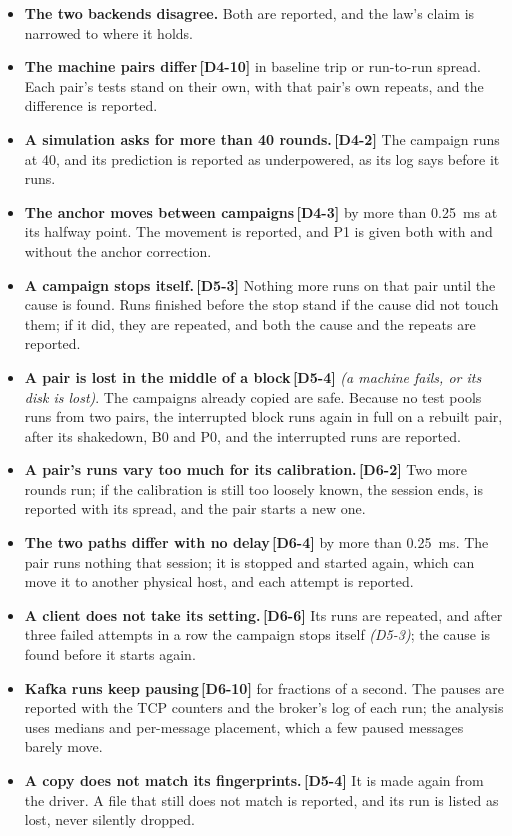 \documentclass[11pt]{article}
\newcommand{\gl}[1]{{\color{soft}\itshape\small (#1)}}
\newcommand{\chg}[1]{\,{\color{chgcol}\bfseries\footnotesize[#1]}}
\newcommand{\chgold}[1]{\,{\color{oldcol}\bfseries\footnotesize[#1]}}
\begin{document}
\begin{itemize}
  \item \textbf{The two backends disagree.} Both are reported, and the law's claim is narrowed to where it holds.
  \item \textbf{The machine pairs differ}\chgold{D4-10} in baseline trip or run-to-run spread. Each pair's tests stand on their own, with that pair's own repeats, and the difference is reported.
  \item \textbf{A simulation asks for more than 40 rounds.}\chgold{D4-2} The campaign runs at 40, and its prediction is reported as underpowered, as its log says before it runs.
  \item \textbf{The anchor moves between campaigns}\chgold{D4-3} by more than 0.25~ms at its halfway point. The movement is reported, and P1 is given both with and without the anchor correction.
  \item \textbf{A campaign stops itself.}\chgold{D5-3} Nothing more runs on that pair until the cause is found. Runs finished before the stop stand if the cause did not touch them; if it did, they are repeated, and both the cause and the repeats are reported.
  \item \textbf{A pair is lost in the middle of a block}\chgold{D5-4} \gl{a machine fails, or its disk is lost}. The campaigns already copied are safe. Because no test pools runs from two pairs, the interrupted block runs again in full on a rebuilt pair, after its shakedown, B0 and P0, and the interrupted runs are reported.
  \item \textbf{A pair's runs vary too much for its calibration.}\chg{D6-2} Two more rounds run; if the calibration is still too loosely known, the session ends, is reported with its spread, and the pair starts a new one.
  \item \textbf{The two paths differ with no delay}\chg{D6-4} by more than 0.25~ms. The pair runs nothing that session; it is stopped and started again, which can move it to another physical host, and each attempt is reported.
  \item \textbf{A client does not take its setting.}\chg{D6-6} Its runs are repeated, and after three failed attempts in a row the campaign stops itself \gl{D5-3}; the cause is found before it starts again.
  \item \textbf{Kafka runs keep pausing}\chg{D6-10} for fractions of a second. The pauses are reported with the TCP counters and the broker's log of each run; the analysis uses medians and per-message placement, which a few paused messages barely move.
  \item \textbf{A copy does not match its fingerprints.}\chgold{D5-4} It is made again from the driver. A file that still does not match is reported, and its run is listed as lost, never silently dropped.
\end{itemize}
\end{document}
